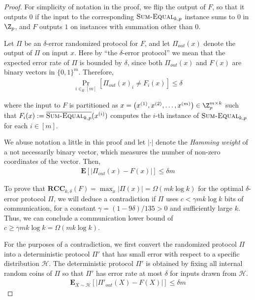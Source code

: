 \documentclass{toc}
\newcommand{\follows}{\ensuremath{\sim}}
\newcommand{\zo}{\ensuremath{ \{ 0, 1 \} }}
\newcommand{\error}{\ensuremath{\delta}}
\newcommand{\bigomega}[1]{\ensuremath{{\Omega \left( {#1} \right)}}}
\newcommand{\eqdef}{\ensuremath{:=}}
\newcommand{\E}{\ensuremath{\mathbf{E}}}
\newcommand{\rcc}{\ensuremath{\mathbf{RCC}}}
\newcommand{\sumequal}{\textsc{Sum-Equal} }
\begin{document}
%
%

	\begin{proof}%
		For simplicity of notation in the proof, we flip the output of $F$, so that it outputs $0$ if the input to the corresponding $\sumequal_{k,p}$ instance sums to $0$ in $\Z_p$, and $F$ outputs $1$ on instances with summation other than $0$.

		Let $\Pi$ be an $\error$-error randomized protocol for $F$, and let $\Pi_{out}\left(x\right)$ denote the output of $\Pi$ on input $x$.
		Here by ``the $\error$-error protocol'' we mean that the expected error rate of $\Pi$ is bounded by $\error$, since both $\Pi_{out}(x)$ and $F(x)$ are binary vectors in $\zo^m$.
		Therefore, 
		\begin{align*}
			\Pr_{i\in_R [m]}\left[\Pi_{out}\left(x\right)_i \ne F_i(x) \right]\le \error
		\end{align*}
		
		
		where the input to $F$ is partitioned as $x=\left(x^{(1)},x^{(2)},\dots,x^{(m)}\right)\in \Z_p^{m\times k}$ such that $F_i(x)\eqdef \overline{\sumequal_{k,p}}(x^{(i)})$ computes the $i$-th instance of $\sumequal_{k,p}$ for each $i\in [m]$.

		We abuse notation a little in this proof and let $|\cdot|$ denote the \emph{Hamming weight} of a not necessarily binary vector, 
		which measures the number of non-zero coordinates of the vector. Then, 
		\begin{align*}
		\E\left[ \left|\Pi_{out}\left(x\right) - F(x)\right| \right]\le \error m 
		\end{align*}

		To prove that $\rcc_{k,\error}(F) = \max_{x}|\Pi(x)|=\bigomega{m k\log k}$ for the optimal $\error$-error protocol $\Pi$,
		we will deduce a contradiction if $\Pi$ uses $c<\gamma m k\log k$ bits of communication,
		for a constant $\gamma=(1-9\error)/135>0$ and sufficiently large $k$.
		Thus, we can conclude a communication lower bound of $c\ge \gamma mk\log k= \bigomega{m k \log k}$.

		For the purposes of a contradiction, we first convert the randomized protocol $\Pi$ into a deterministic protocol $\Pi'$ that has small error with respect to a specific distribution $\mathcal{H}$. 
		The deterministic protocol $\Pi'$ is obtained by fixing all internal random coins of $\Pi$ so that $\Pi'$ has error rate at most $\error$ for inputs drawn from $\mathcal{H}$.
		\begin{align*}
			\E_{X\follows \mathcal{H}}\left[ \left| \Pi'_{out}(X) - F(X)\right| \right]\le \error m
		\end{align*}


\end{proof}
\end{document}
